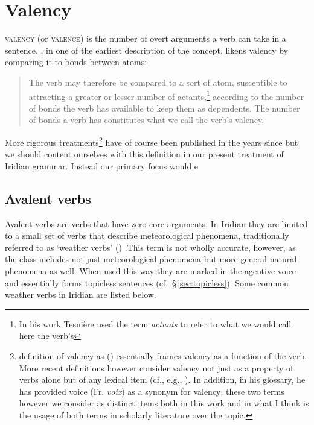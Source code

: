 \section{Valency}

{\scshape valency} (or {\scshape valence}) is the number of overt
arguments a verb can take in a sentence.
\textcite[239]{tesniere1965}, in one of the earliest description of the concept,
likens valency by comparing it to bonds between atoms:
\begin{quotation}
	\small
The verb may therefore be compared to a sort of atom, susceptible to attracting
a greater or lesser number of actants,\footnote{In his work Tesnière used the
term \emph{actants} to refer to what we would call here the verb's
} according to the number of bonds the verb has available to
keep them as dependents. The number of bonds a verb has constitutes what we call
the verb's valency.
\end{quotation}

More rigorous treatments\footnote{ definition of valency
as 
()
essentially frames valency as a function of the verb. More recent definitions
however consider valency not just as a property of verbs alone but of any
lexical item (cf., e.g., \cite{matthews1997,trask1993}). In addition, in his
glossary, he has provided voice (Fr. \emph{voix}) as a synonym for valency;
these two terms however we consider as distinct items both in this work and in
what I think is the usage of both terms in scholarly literature over the topic.}
have of course been published in the years since but we should content ourselves
with this definition in our present treatment of Iridian grammar. Instead our
primary focus would e

\subsection{Avalent verbs}

Avalent verbs  are verbs that have zero core arguments. In
Iridian they are limited to a small set of verbs that describe meteorological
phenomena, traditionally referred to as `weather verbs' ()
.This term is not wholly accurate, however, as the class
includes not just meteorological phenomena but more general natural phenomena as
well. When used this way they are marked in the agentive voice and essentially forms topicless sentences
(cf.~\S\,\ref{sec:topicless}). Some common weather verbs in Iridian are listed
below.

